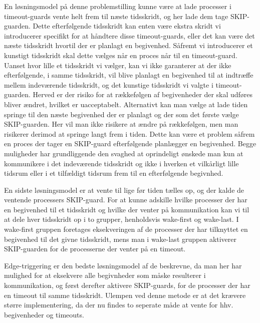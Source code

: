 En løsningsmodel på denne problemstilling kunne være at lade processer i timeout-guards vente helt frem til næste tidsskridt, og her lade dem tage SKIP-guarden. Dette efterfølgende tidsskridt kan enten være ekstra skridt vi introducerer specifikt for at håndtere disse timeout-guards, eller det kan være det næste tidsskridt hvortil der er planlagt en begivenhed. 
Såfremt vi introducerer et kunstigt tidsskridt skal dette vælges når en proces når til en timeout-guard. Uanset hvor lille et tidsskridt vi vælger, kan vi ikke garanterer at der ikke efterfølgende, i samme tidsskridt, vil blive planlagt en begivenhed til at indtræffe mellem indeværende tidsskridt, og det kunstige tidsskridt vi valgte i timeout-guarden. Herved er der risiko for at rækkefølgen af begivenheder der skal udføres bliver ændret, hvilket er uacceptabelt. 
Alternativt kan man vælge at lade tiden springe til den næste begivenhed der er planlagt og der som det første vælge SKIP-guarden. Her vil man ikke risikere at ændre på rækkefølgen, men man risikerer derimod at springe langt frem i tiden. Dette kan være et problem såfrem en proces der tager en SKIP-guard efterfølgende planlægger en begivenhed.
Begge muligheder har grundliggende den svaghed at oprindeligt ønskede man kun at kommunikere i det indeværende tidsskridt og ikke i hverken et vilkårligt lille tidsrum eller i et tilfældigt tidsrum frem til en efterfølgende begivnhed.

En sidste løsningsmodel er at vente til lige før tiden tælles op, og der kalde de ventende processers SKIP-guard. 
For at kunne adskille hvilke processer der har en begivenhed til et tidsskridt og hvilke der venter på kommunikation kan vi  til at dele hver tidsskridt op i to grupper, henholdsvis wake-first og wake-last.
I wake-first gruppen foretages eksekveringen af de processer der har tilknyttet en begivenhed til det givne tidsskridt, mens man i  wake-last gruppen aktiverer SKIP-guarden for de processerne der venter på en timeout.

Edge-triggering er den bedste løsningsmodel af de beskrevne, da man her har mulighed for at eksekvere alle begivnheder som måske resulterer i kommunikation, og først derefter aktivere SKIP-guards, for de processer der har en timeout til samme tidsskridt. Ulempen ved denne metode er at det krævere større implementering, da der nu findes to seperate måde at vente for hhv. begivenheder og timeouts.

